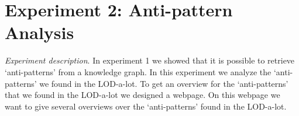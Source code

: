 \documentclass[11pt,letterpaper ,oneside ]{book}
\begin{document}
	
	\section{Experiment 2: Anti-pattern Analysis} %
	\textit{Experiment description}. In experiment 1 we showed that it is possible to retrieve `anti-patterns' from a knowledge graph. In this experiment we analyze the `anti-patterns' we found in the LOD-a-lot. To get an overview for the `anti-patterns' that we found in the LOD-a-lot we designed a webpage. On this webpage we want to give several overviews over the `anti-patterns' found in the LOD-a-lot.
	
	\begin{figure}[!t]
	\end{figure}
	
\end{document}
